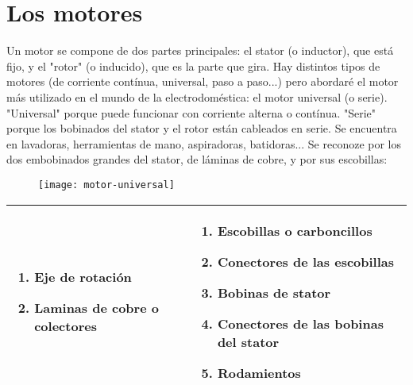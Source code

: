 \section{Los motores}

Un motor se compone de dos partes principales: el stator (o inductor), que está fijo, y el "rotor" (o inducido), que es la parte que gira. Hay distintos tipos de motores (de corriente contínua, universal, paso a paso...) pero abordaré el motor más utilizado en el mundo de la electrodoméstica: el motor universal (o serie).
"Universal" porque puede funcionar con corriente alterna o contínua. "Serie" porque los bobinados del stator y el rotor están cableados en serie. Se encuentra en lavadoras, herramientas de mano, aspiradoras, batidoras...
Se reconoze por los dos embobinados grandes del stator, de láminas de cobre, y por sus escobillas:
\begin{figure}[h]
\centering
\texttt{[image: motor-universal]}
\end{figure}


\begin{tabularx}{\textwidth}{|X|X|}
\hline
\begin{enumerate}
	\setlength\itemsep{0em}
    \item Eje de rotación
    \item Laminas de cobre o colectores
\end{enumerate}
&
\begin{enumerate}
	\setlength\itemsep{0em}
	\setcounter{enumi}{2} %
    \item Escobillas o carboncillos
    \item Conectores de las escobillas
    \item Bobinas de stator
    \item Conectores de las bobinas del stator
    \item Rodamientos
\end{enumerate} \\
\hline
\end{tabularx}

